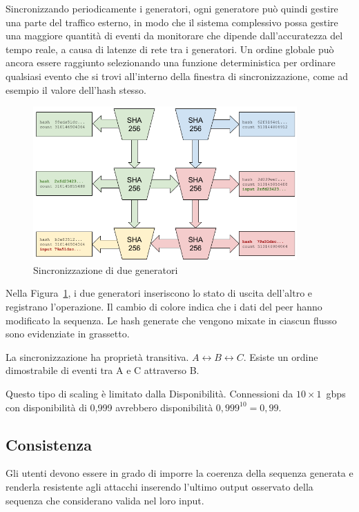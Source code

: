 \documentclass[12pt]{article}
\begin{document}
Sincronizzando periodicamente i generatori, ogni generatore può quindi gestire una parte del traffico esterno, in modo che il sistema complessivo possa gestire una maggiore quantità di eventi da monitorare che dipende dall'accuratezza del tempo reale, a causa di latenze di rete tra i generatori. Un ordine globale può ancora essere raggiunto selezionando una funzione deterministica per ordinare qualsiasi evento che si trovi all'interno della finestra di sincronizzazione, come ad esempio il valore dell'hash stesso.


\begin{figure}
  \begin{center}
    \centering
    \includegraphics[width=0.9\textwidth]{figures/fig_5.png}
    \caption[Fig 5]{Sincronizzazione di due generatori\label{fig:poh_scale}}
  \end{center}
  \end{figure}

Nella Figura~\ref{fig:poh_scale}, i due generatori inseriscono lo stato di uscita dell'altro e registrano l'operazione. Il cambio di colore indica che i dati del peer hanno modificato la sequenza.  Le hash generate che vengono mixate in ciascun flusso sono evidenziate in grassetto. 

La sincronizzazione ha proprietà transitiva. \(A \leftrightarrow B \leftrightarrow C\). Esiste un ordine dimostrabile di eventi tra A e C attraverso B.

Questo tipo di scaling è limitato dalla Disponibilità. Connessioni da $10 \times 1$~gbps con disponibilità di 0,999 avrebbero disponibilità \(0,999^{10} = 0,99 \).

\subsection{Consistenza}
Gli utenti devono essere in grado di imporre la coerenza della sequenza generata e renderla resistente agli attacchi inserendo l'ultimo output osservato della sequenza che considerano valida nel loro input.\\
\end{document}
